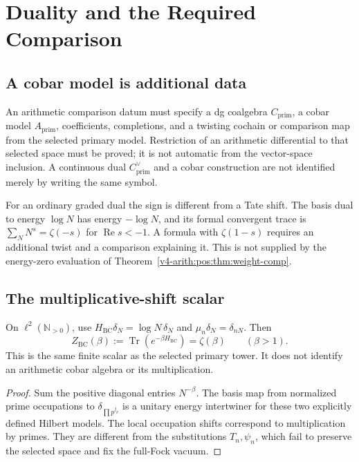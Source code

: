 \section{Duality and the Required Comparison}
\label{v4-arith:prim-zeta:koszul-dual-char}
\label{v4-arith:prim-zeta:att-3-koszul-dual}
\subsection{A cobar model is additional data}
\label{v4-arith:prim-zeta:cobar-primary}
\begin{definition}
\label{v4-arith:prim-zeta:def:cobar-primary}
An arithmetic comparison datum must specify a dg coalgebra
\(C_{\mathrm{prim}}\), a cobar model \(A_{\mathrm{prim}}\), coefficients,
completions, and a twisting cochain or comparison map from the selected
primary model. Restriction of an arithmetic differential to that selected
space must be proved; it is not automatic from the vector-space
inclusion. A continuous dual \(C_{\mathrm{prim}}^\vee\) and a cobar
construction are not identified merely by writing the same symbol.
\end{definition}

For an ordinary graded dual the sign is different from a Tate shift.
The basis dual to energy \(\log N\) has energy \(-\log N\), and its
formal convergent trace is \(\sum_NN^s=\zeta(-s)\) for
\(\operatorname{Re}s<-1\). A formula with \(\zeta(1-s)\) requires an
additional twist and a comparison explaining it. This is not supplied
by the energy-zero evaluation of
Theorem~\ref{v4-arith:pos:thm:weight-comp}.

\subsection{The multiplicative-shift scalar}
\label{v4-arith:prim-zeta:BC-KMS}
\begin{theorem}
\label{v4-arith:prim-zeta:thm:BC-partition}
On \(\ell^2(\mathbb N_{>0})\), use
\(H_{\mathrm{BC}}\delta_N=\log N\,\delta_N\) and
\(\mu_n\delta_N=\delta_{nN}\). Then
\begin{equation}
\label{v4-arith:prim-zeta:eq:BC-partition}
 Z_{\mathrm{BC}}(\beta):=\operatorname{Tr}(e^{-\beta H_{\mathrm{BC}}})
 =\zeta(\beta)\qquad(\beta>1).
\end{equation}
This is the same finite scalar as the selected primary tower. It does
not identify an arithmetic cobar algebra or its multiplication.
\end{theorem}
\begin{proof}
Sum the positive diagonal entries \(N^{-\beta}\). The basis map from
normalized prime occupations to \(\delta_{\prod p^{j_p}}\) is a unitary
energy intertwiner for these two explicitly defined Hilbert models.
The local occupation shifts correspond to multiplication by primes.
They are different from the substitutions \(T_n,\psi_n\), which fail
to preserve the selected space and fix the full-Fock vacuum.
\end{proof}

